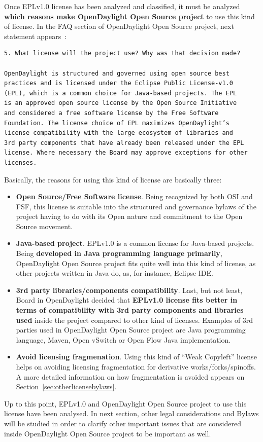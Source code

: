 \documentclass[a4paper, 12pt]{book}
\begin{document}
Once EPLv1.0 license has been analyzed and classified, it must be analyzed \textbf{which reasons make OpenDaylight Open Source project} to use this kind of license. In the FAQ section of OpenDaylight Open Source project, next statement appears~\cite{OpenDaylightFAQ5}:

\begin{verbatim}
5. What license will the project use? Why was that decision made?

OpenDaylight is structured and governed using open source best
practices and is licensed under the Eclipse Public License-v1.0
(EPL), which is a common choice for Java-based projects. The EPL
is an approved open source license by the Open Source Initiative
and considered a free software license by the Free Software
Foundation. The license choice of EPL maximizes OpenDaylight’s
license compatibility with the large ecosystem of libraries and
3rd party components that have already been released under the EPL
license. Where necessary the Board may approve exceptions for other
licenses.
\end{verbatim}
Basically, the reasons for using this kind of license are basically three:
\begin{itemize}
 \item{\textbf{Open Source/Free Software license}}. Being recognized by both OSI and FSF, this license is suitable into the structured and governance bylaws of the project having to do with its Open nature and commitment to the Open Source movement.
 \item{\textbf{Java-based project}}. EPLv1.0 is a common license for Java-based projects. Being \textbf{developed in Java programming language primarily}, OpenDaylight Open Source project fits quite well into this kind of license, as other projects written in Java do, as, for instance, Eclipse IDE.
 \item{\textbf{3rd party libraries/components compatibility}}. Last, but not least, Board in OpenDaylight decided that \textbf{EPLv1.0 license fits better in terms of compatibility with 3rd party components and libraries used} inside the project compared to other kind of licenses. Examples of 3rd parties used in OpenDaylight Open Source project are Java programming language, Maven, Open vSwitch or Open Flow Java implementation.
 \item{\textbf{Avoid licensing fragmenation}}. Using this kind of ``Weak Copyleft'' license helps on avoiding licensing fragmentation for derivative works/forks/spinoffs. A more detailed information on how fragmentation is avoided appears on Section~\ref{sec:otherlicensebylaws}.
\end{itemize}
Up to this point, EPLv1.0 and OpenDaylight Open Source project to use this license have been analysed. In next section, other legal considerations and Bylaws will be studied in order to clarify other important issues that are considered inside OpenDaylight Open Source project to be important as well.
\end{document}

